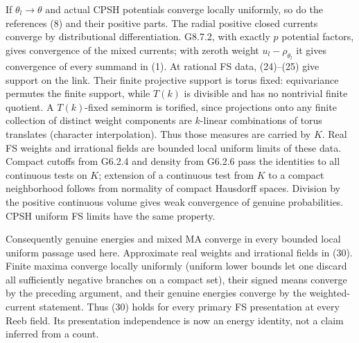 \documentclass[
  10pt,
]{article}
\begin{document}
If \(\theta_l\to\theta\) and actual CPSH potentials converge locally
uniformly, so do the references (8) and their positive parts. The radial
positive closed currents converge by distributional differentiation.
G8.7.2, with exactly \(p\) potential factors, gives convergence of the
mixed currents; with zeroth weight \(u_l-\rho_{\theta_l}\) it gives
convergence of every summand in (1). At rational FS data, (24)--(25)
give support on the link. Their finite projective support is torus
fixed: equivariance permutes the finite support, while \(T(k)\) is
divisible and has no nontrivial finite quotient. A \(T(k)\)-fixed
seminorm is torified, since projections onto any finite collection of
distinct weight components are \(k\)-linear combinations of torus
translates (character interpolation). Thus those measures are carried by
\(K\). Real FS weights and irrational fields are bounded local uniform
limits of these data. Compact cutoffs from G6.2.4 and density from
G6.2.6 pass the identities to all continuous tests on \(K\); extension
of a continuous test from \(K\) to a compact neighborhood follows from
normality of compact Hausdorff spaces. Division by the positive
continuous volume gives weak convergence of genuine probabilities. CPSH
uniform FS limits have the same property.

Consequently genuine energies and mixed MA converge in every bounded
local uniform passage used here. Approximate real weights and irrational
fields in (30). Finite maxima converge locally uniformly (uniform lower
bounds let one discard all sufficiently negative branches on a compact
set), their signed means converge by the preceding argument, and their
genuine energies converge by the weighted-current statement. Thus (30)
holds for every primary FS presentation at every Reeb field. Its
presentation independence is now an energy identity, not a claim
inferred from a count.
\end{document}
